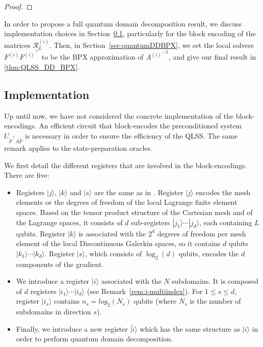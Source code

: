 \documentclass[onefignum,onetabnum]{siamart251216}
\newcommand{\ket}[1]{ | #1 \rangle}
\begin{document}
\begin{proof}
\end{proof}

In order to propose a full quantum domain decomposition result, we discuss implementation choices in Section~\ref{sec:impRitilde}, particularly for the block encoding of the matrices $\mathcal{R}_L^{(i)}$. Then, in Section~\ref{sec:quantumDDBPX}, we set the local solvers $F^{(i)}{F^{(i)}}^\top$ to be the BPX approximation of ${A^{(i)}}^{-1}$, and give our final result in \cref{thm:QLSS_DD_BPX}.

\subsection{Implementation}
\label{sec:impRitilde}
Up until now, we have not considered the concrete implementation of the block-encodings. An efficient circuit that block-encodes the preconditioned system $U_{\tilde{F}^\top A \tilde{F}}$ is necessary in order to ensure the efficiency of the QLSS. The same remark applies to the state-preparation oracles. 

We first detail the different registers that are involved in the block-encodings. There are five: 
\begin{itemize}
\item Registers $\ket{j}$, $\ket{k}$ and $\ket{s}$ are the same as in \cite{Deiml_2025}. Register $\ket{j}$ encodes the mesh elements or the degrees of freedom of the local Lagrange finite element spaces. Based on the tensor product structure of the Cartesian mesh and of the Lagrange spaces, it consists of $d$ sub-registers $\ket{j_1} \cdots \ket{j_d}$, each containing $L$ qubits. Register $\ket{k}$ is associated with the $2^d$ degrees of freedom per mesh element of the local Discontinuous Galerkin spaces, so it contains $d$ qubits $\ket{k_1} \cdots \ket{k_d}$. Register $\ket{s}$, which consists of $\log_2(d)$ qubits, encodes the $d$ components of the gradient. 
\item We introduce a register $\ket{i}$ associated with the $N$ subdomains. It is composed of $d$ registers $\ket{i_1} \cdots \ket{i_d}$ (see Remark~\ref{rem:i-multiindex}). For $1 \leq s \leq d $, register $\ket{i_s}$ contains $n_s= log_2(N_s)$ qubits (where $N_s$ is the number of subdomains in direction $s$).
\item Finally, we introduce a new register $\ket{\tilde{i}}$ which has the same structure as $\ket{i}$ in order to perform quantum domain decomposition. 
\end{itemize}
\medskip
\end{document}
